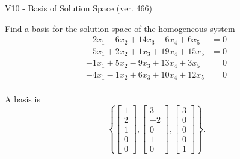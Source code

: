\begin{exercise}
  \begin{exerciseTitle}V10 - Basis of Solution Space (ver. 466)\end{exerciseTitle}
  \begin{exerciseStatement}
    Find a basis for the solution space of the homogeneous system 
\begin{align*}
 -2 x_ 1 -6 x_ 2 + 14 x_ 3 -6 x_ 4 + 6 x_ 5 &= 0  \\ 
  -5 x_ 1 + 2 x_ 2 + 1 x_ 3 + 19 x_ 4 + 15 x_ 5 &= 0  \\ 
  -1 x_ 1 + 5 x_ 2 -9 x_ 3 + 13 x_ 4 + 3 x_ 5 &= 0  \\ 
  -4 x_ 1 -1 x_ 2 + 6 x_ 3 + 10 x_ 4 + 12 x_ 5 &= 0  \\ 
 \end{align*}


 
  \end{exerciseStatement}

  \begin{exerciseAnswer}
   A basis is   
\[\left\{\left[\begin{array}{c}
1 \\
2 \\
1 \\
0 \\
0
\end{array}\right] , \left[\begin{array}{c}
3 \\
-2 \\
0 \\
1 \\
0
\end{array}\right] , \left[\begin{array}{c}
3 \\
0 \\
0 \\
0 \\
1
\end{array}\right]\right\}.\]

  


  \end{exerciseAnswer}
\end{exercise}